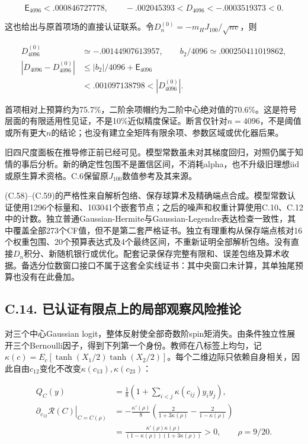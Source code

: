 \documentclass[11pt,a4paper]{article}
\begin{document}
\[
\mathsf E_{4096}<.000846727778,\qquad
-.002045393<D_{4096}<-.0003519373<0.
\tag{C.58}
\]

这也给出与原首项场的直接认证联系。令\(D_n^{(0)}=-m_HJ_{100}/\sqrt{nv}\)，则

\[
\begin{aligned}
D_{4096}^{(0)}&\simeq-.00144907613957,\qquad b_2/4096\simeq.000250411019862,\\
|D_{4096}-D_{4096}^{(0)}|
&\le |b_2|/4096+\mathsf E_{4096}\\
&<.001097138798<|D_{4096}^{(0)}|.
\end{aligned}
\tag{C.59}
\]

首项相对上预算约为75.7\%，二阶余项帽约为二阶中心绝对值的70.6\%。这是符号层面的有限适用性见证，不是10\%近似精度保证。断言仅针对\(n=4096\)，不是阈值或所有更大\(n\)的结论；也没有建立全矩阵有限余项、参数区域或优化器后果。

旧四尺度面板在推导修正前已经可见。模型常数虽未对其梯度回归，对照仍属于知情的事后分析。新的确定性包围不是置信区间，不消耗alpha，也不升级旧理想iid或原生算术资格。C.6保留原\(J_{100}\)数值参考及其来源。

(C.58)--(C.59)的严格性来自解析包络、保存球算术及精确端点合成。模型常数认证使用1296个标量和、103041个嵌套节点；之后的噪声和权重计算使用C.10、C.12中的计数。独立普通Gaussian-Hermite与Gaussian-Legendre表达检查一致性，其中覆盖全部273个CF值，但不是第二套严格证书。独立有理重构从保存端点核对16个权重包围、20个预算表达式及4个最终区间，不重新证明全部解析包络。没有直接\(D_n\)积分、新随机银行或优化。配套记录保存完整有限和、误差包络及算术收据。备选分位数窗口接口不属于这套全实线证书：其中央窗口未计算，其单独尾预算也没有在此叠加。

\subsection*{C.14.
已认证有限点上的局部观察风险推论}\label{c.14.-ux5df2ux8ba4ux8bc1ux6709ux9650ux70b9ux4e0aux7684ux5c40ux90e8ux89c2ux5bdfux98ceux9669ux63a8ux8bba}

对三个中心Gaussian
logit，整体反射使全部奇数阶spin矩消失。由条件独立性展开三个Bernoulli因子，得到下列第一个身份。教师在八标签上均匀，记\(\kappa(c)=E_c[\tanh(X_1/2)\tanh(X_2/2)]\)。每个二维边际只依赖自身相关，因此自由\(c_{12}\)变化不改变\(\kappa(c_{13}),\kappa(c_{23})\)：

\[
\begin{aligned}
Q_C(y)&=\tfrac18\left(1+\sum_{i<j}\kappa(c_{ij})y_iy_j\right),\\
\left.\partial_{c_{12}}\mathcal R(C)\right|_{C=C(\rho)}
&=-\frac{\kappa'(\rho)}8
\left(\frac2{1+3\kappa(\rho)}-\frac2{1-\kappa(\rho)}\right)\\
&=\frac{\kappa'(\rho)\kappa(\rho)}{(1-\kappa(\rho))(1+3\kappa(\rho))}>0,
\qquad \rho=9/20.
\end{aligned}
\tag{C.60}
\]
\end{document}
